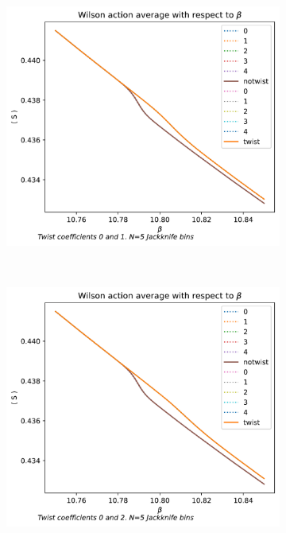 \documentclass[english,twoside,openright]{UH_TCM_MSc}
\begin{document}
\begin{figure}[htpb]
    \centering
    \begin{subfigure}[t]{0.5\textwidth}
        \centering
        \includegraphics[width=\textwidth]{final_plots/24_24_36_highlight/action_0-1.pdf}
        \caption{}
    \end{subfigure}%
    ~ 
    \begin{subfigure}[t]{0.5\textwidth}
        \centering
        \includegraphics[width=\textwidth]{final_plots/24_24_36_highlight/action_0-2.pdf}

\end{subfigure}
\end{figure}
\end{document}
